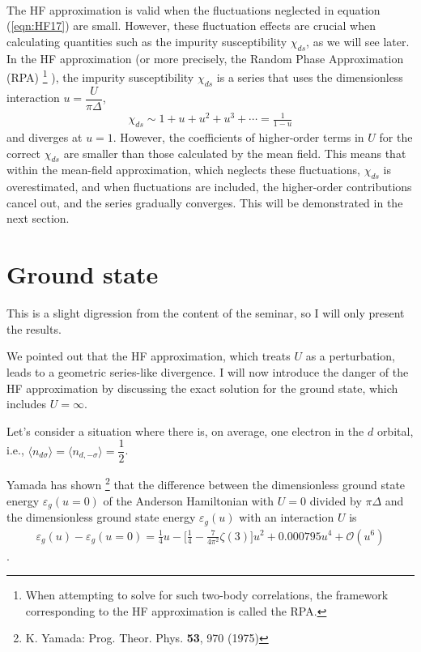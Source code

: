 \documentclass[a4j]{jarticle}
\begin{document}
\ \\[2mm]

The HF approximation is valid when the fluctuations neglected in equation (\ref{eqn:HF17}) are small.
However, these fluctuation effects are crucial when calculating quantities such as the impurity susceptibility $\chi_{ds}$, as we will see later.
In the HF approximation
(or more precisely, the Random Phase Approximation (RPA)
\footnote{
	When attempting to solve for such two-body correlations, the framework corresponding to the HF approximation is called the RPA.
}
), the impurity susceptibility $\chi_{ds}$ is a series that uses the dimensionless interaction $u=\dfrac{U}{\pi \Delta}$,
\begin{align}
	\chi_{ds}
	\sim
	1
	+
	u
	+
	u^{2}
	+
	u^{3}
	+
	\cdots
	=
	\frac{1}{1-u}
\end{align}
and diverges at $u=1$.
However, the coefficients of higher-order terms in $U$ for the correct $\chi_{ds}$ are smaller than those calculated by the mean field.
This means that within the mean-field approximation, which neglects these fluctuations, $\chi_{ds}$ is overestimated, and when fluctuations are included, the higher-order contributions cancel out, and the series gradually converges.
This will be demonstrated in the next section.

\section*{Ground state}

This is a slight digression from the content of the seminar, so I will only present the results.

We pointed out that the HF approximation, which treats $U$ as a perturbation, leads to a geometric series-like divergence.
I will now introduce the danger of the HF approximation by discussing the exact solution for the ground state, which includes $U=\infty$.

Let's consider a situation where there is, on average, one electron in the $d$ orbital, i.e., $
	\langle n_{d \sigma} \rangle
	=
	\langle n_{d, -\sigma} \rangle
	=
	\dfrac{1}{2}
$.

Yamada has shown
\footnote{
	K. Yamada: Prog. Theor. Phys. {\bf 53}, 970 (1975)
}
that the difference between the dimensionless ground state energy $\varepsilon_{g}(u=0)$ of the Anderson Hamiltonian with $U=0$ divided by $\pi \Delta$ and the dimensionless ground state energy $\varepsilon_{g}(u)$ with an interaction $U$ is
\begin{align}
	\varepsilon_{g}(u)-
	\varepsilon_{g}(u=0)
	=
	\frac{1}{4}
	u
	-
	\bigg[
		\frac{1}{4}
		-
		\frac{7}{4 \pi^{2}}
		\zeta(3)
		\bigg]
	u^{2}
	+
	0.000795u^{4}
	+
	\mathcal{O}(u^{6})
	\label{eqn:yamadakousaku}
\end{align}
.
\end{document}
